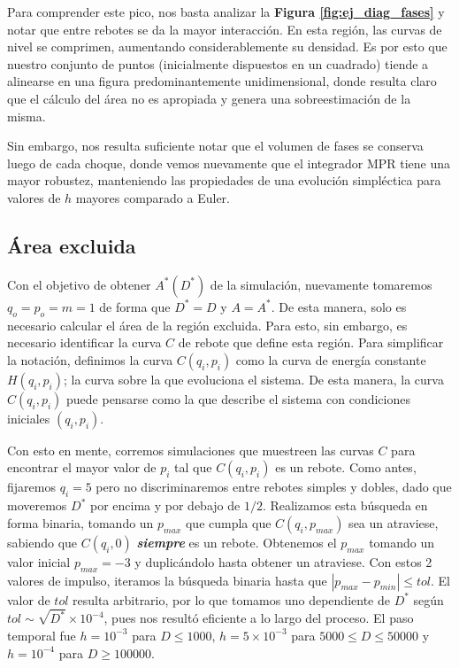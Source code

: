 Para comprender este pico, nos basta analizar la \textbf{Figura \ref{fig:ej_diag_fases}} y notar que entre rebotes se da la mayor interacción.
En esta región, las curvas de nivel se comprimen, aumentando considerablemente su densidad.
Es por esto que nuestro conjunto de puntos (inicialmente dispuestos en un cuadrado) tiende a alinearse en una figura predominantemente unidimensional, donde resulta claro que el cálculo del área
no es apropiada y genera una sobreestimación de la misma.

Sin embargo, nos resulta suficiente notar que el volumen de fases se conserva luego de cada choque, donde vemos nuevamente que el integrador MPR tiene una mayor robustez,
manteniendo las propiedades de una evolución simpléctica para valores de $h$ mayores comparado a Euler.


\subsection{Área excluida}{\label{sec:area_ex_comp}}

Con el objetivo de obtener $A^*(D^*)$ de la simulación, nuevamente tomaremos $q_o = p_o = m = 1$ de forma que $D^* = D$ y $A=A^*$.
De esta manera, solo es necesario calcular el área de la región excluida.
Para esto, sin embargo, es necesario identificar la curva $C$ de rebote que define esta región.
Para simplificar la notación, definimos la curva $C(q_i,p_i)$ como la curva de energía constante $H(q_i,p_i)$; la curva sobre la que evoluciona el sistema.
De esta manera, la curva $C(q_i,p_i)$ puede pensarse como la que describe el sistema con condiciones iniciales $(q_i,p_i)$.

Con esto en mente, corremos simulaciones que muestreen las curvas $C$ para encontrar el mayor valor de $p_i$ tal que $C(q_i, p_i)$ es un rebote.
Como antes, fijaremos $q_i=5$ pero no discriminaremos entre rebotes simples y dobles, dado que moveremos $D^*$ por encima y por debajo de $1/2$.
Realizamos esta búsqueda en forma binaria, tomando un $p_{max}$ que cumpla que $C(q_i, p_{max})$ sea un atraviese, sabiendo que $C(q_i, 0)$ \textbf{\textit{siempre}} es un rebote.
Obtenemos el $p_{max}$ tomando un valor inicial $p_{max} = -3$ y duplicándolo hasta obtener un atraviese.
Con estos 2 valores de impulso, iteramos la búsqueda binaria hasta que $|p_{max}-p_{min}|\leq tol$.
El valor de $tol$ resulta arbitrario, por lo que tomamos uno dependiente de $D^*$ según $tol \sim \sqrt{D^*}\times 10^{-4}$, pues nos resultó eficiente a lo largo del proceso.
El paso temporal fue $h=10^{-3}$ para $D\leq 1000$, $h=5\times10^{-3}$ para $5000\leq D\leq 50000$ y $h=10^{-4}$ para $D\geq 100000$.

